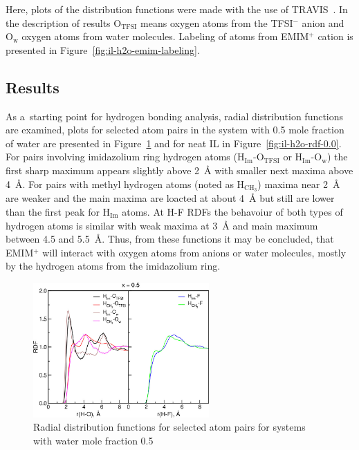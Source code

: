Here, plots of the distribution functions were made with the use of TRAVIS~\cite{travis-1,travis-2}. In the description of results O$_{\text{TFSI}}$ means oxygen atoms from the TFSI$^{-}$ anion and O$_{\text{w}}$ oxygen atoms from water molecules. Labeling of atoms from EMIM$^{+}$ cation is presented in Figure~\ref{fig:il-h2o-emim-labeling}.

\subsection{Results}

As a~starting point for hydrogen bonding analysis, radial distribution functions are examined, plots for selected atom pairs in the system with 0.5 mole fraction of water are presented in Figure~\ref{fig:il-h2o-rdf-0.5} and for neat IL in Figure~\ref{fig:il-h2o-rdf-0.0}. For pairs involving imidazolium ring hydrogen atoms (H$_{\text{Im}}$-O$_{\text{TFSI}}$ or H$_{\text{Im}}$-O$_{\text{w}}$) the first sharp maximum appears slightly above 2~{\AA} with smaller next maxima above 4~{\AA}. For pairs with methyl hydrogen atoms (noted as H$_{\text{CH}_3}$) maxima near 2~{\AA} are weaker and the main maxima are loacted at about 4~{\AA} but still are lower than the first peak for H$_{\text{Im}}$ atoms. At H-F RDFs the behavoiur of both types of hydrogen atoms is similar with weak maxima at 3~{\AA} and main maximum between 4.5 and 5.5~{\AA}. Thus, from these functions it may be concluded, that EMIM$^{+}$ will interact with oxygen atoms from anions or water molecules, mostly by the hydrogen atoms from the imidazolium ring.

\begin{figure}
    \centering
    \includegraphics[width=0.6\textwidth]{img/3-structural-data-from-md-simulations/6-il-h2o/rdf-0.5.png}
    \caption{Radial distribution functions for selected atom pairs for systems with water mole fraction 0.5}
    \label{fig:il-h2o-rdf-0.5}
\end{figure}

